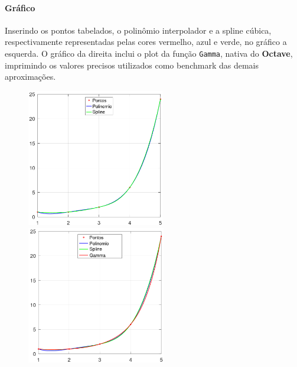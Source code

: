 \documentclass{article}
\begin{document}
            \paragraph{Gráfico}Inserindo os pontos tabelados, o polinômio interpolador e a spline cúbica, respectivamente representadas pelas cores vermelho, azul e verde, no gráfico a esquerda. O gráfico da direita inclui o plot da função \texttt{Gamma}, nativa do \textbf{Octave}, imprimindo os valores precisos utilizados como benchmark das demais aproximações.

                \begin{figure}[h]
                    \includegraphics[width = 6cm]{polinomio.png}
                    \includegraphics[width = 6.05cm]{polinomio1.png}
                    \centering
                \end{figure}
\newpage
\end{document}
